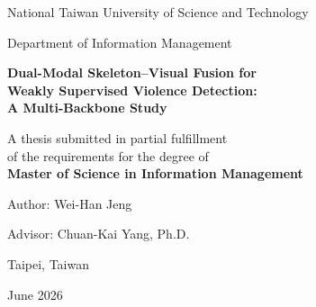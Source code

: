 \begin{titlepage}
  \centering
  \vspace*{2cm}

  {\large National Taiwan University of Science and Technology\par}
  \vspace{0.3cm}
  {\large Department of Information Management\par}

  \vspace{2.3cm}
  {\fontsize{24}{29}\selectfont\bfseries Dual-Modal Skeleton--Visual Fusion for\\[0.4em]
   Weakly Supervised Violence Detection:\\[0.4em]
   A Multi-Backbone Study\par}

  \vspace{2.3cm}
  {\large A thesis submitted in partial fulfillment\\
   of the requirements for the degree of\\[0.4em]
   \textbf{Master of Science in Information Management}\par}

  \vspace{2.3cm}
  {\large Author: Wei-Han Jeng\par}
  \vspace{0.6cm}
  {\large Advisor: Chuan-Kai Yang, Ph.D.\par}

  \vfill
  {\large Taipei, Taiwan\par}
  \vspace{0.4cm}
  {\large June 2026\par}
\end{titlepage}
